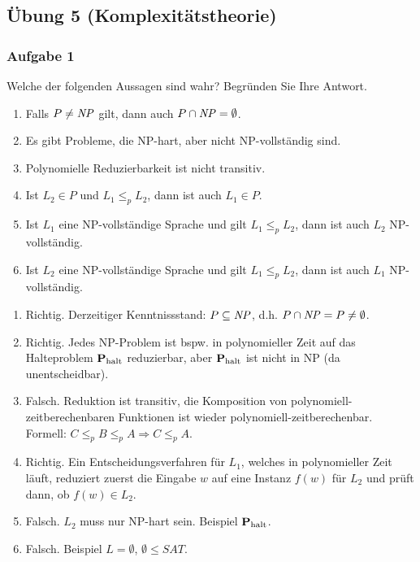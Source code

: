 \subsection*{Übung 5 (Komplexitätstheorie)}
\subsubsection*{Aufgabe 1}
    Welche der folgenden Aussagen sind wahr? Begründen Sie Ihre Antwort.
    \begin{enumerate}
        \item Falls $P \neq \mathit{NP}$ gilt, dann auch $P \cap \mathit{NP} = \emptyset$.{}
        \item Es gibt Probleme, die NP-hart, aber nicht NP-vollständig sind.
        \item Polynomielle Reduzierbarkeit ist nicht transitiv.
        \item Ist $L_{2} \in P$ und $L_{1} \leq_{p} L_{2}$, dann ist auch $L_{1} \in P$.
        \item Ist $L_{1}$ eine NP-vollständige Sprache und gilt $L_{1} \leq_{p} L_{2}$, dann ist auch $L_{2}$ NP-vollständig.
        \item Ist $L_{2}$ eine NP-vollständige Sprache und gilt $L_{1} \leq_{p} L_{2}$, dann ist auch $L_{1}$ NP-vollständig.
    \end{enumerate}

    \LOES
    \begin{enumerate}
        \item Richtig. Derzeitiger Kenntnissstand: $P \subseteq \mathit{NP}$, d.h. $P \cap \mathit{NP} = P \neq \emptyset$.{}
        \item Richtig. Jedes NP-Problem ist bspw. in polynomieller Zeit auf das Halteproblem $\textbf{P}_{\text{halt}}$ reduzierbar, aber $\textbf{P}_{\text{halt}}$ ist nicht in NP (da unentscheidbar).
        \item Falsch. Reduktion ist transitiv, die Komposition von polynomiell-zeitberechenbaren Funktionen ist wieder polynomiell-zeitberechenbar. Formell: $C \leq_{p} B \leq_{p} A \Rightarrow C \leq_{p} A$.
        \item Richtig. Ein Entscheidungsverfahren für $L_{1}$, welches in polynomieller Zeit läuft, reduziert zuerst die Eingabe $w$ auf eine Instanz $f(w)$ für $L_{2}$ und prüft dann, ob $f(w) \in L_{2}$.
        \item Falsch. $L_{2}$ muss nur NP-hart sein. Beispiel $\textbf{P}_{\text{halt}}$.
        \item Falsch. Beispiel $L = \emptyset$, $\emptyset \leq SAT$.
    \end{enumerate}


